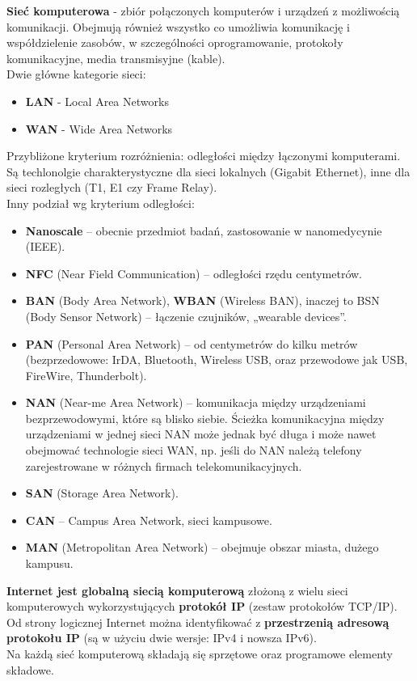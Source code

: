 \documentclass[../main.tex]{subfiles}
\begin{document}
    \textbf{Sieć komputerowa} - zbiór połączonych komputerów i urządzeń z możliwością komunikacji. Obejmują	również	wszystko co	umożliwia
    komunikację i współdzielenie zasobów, w szczególności oprogramowanie, protokoły komunikacyjne, media transmisyjne (kable).
    \\
    Dwie główne kategorie sieci:
    \begin{itemize}
        \item \textbf{LAN} - Local Area Networks
        \item \textbf{WAN} - Wide Area Networks
    \end{itemize}

    Przybliżone  kryterium	 rozróżnienia: odległości między łączonymi	komputerami. Są techlonolgie charakterystyczne dla
    sieci	lokalnych (Gigabit Ethernet),	inne dla sieci rozległych (T1,	E1	czy	Frame	Relay).
    \\
    Inny podział wg kryterium odległości:
    \begin{itemize}
        \item \textbf{Nanoscale} – obecnie przedmiot badań, zastosowanie w nanomedycynie (IEEE).
        \item \textbf{NFC} (Near Field Communication) – odległości	rzędu	centymetrów.
        \item \textbf{BAN} (Body Area Network),	\textbf{WBAN} (Wireless	BAN),	inaczej to	BSN	(Body	Sensor	Network) – łączenie	czujników,	„wearable	devices”.
        \item \textbf{PAN} (Personal Area Network) – od centymetrów	do	kilku metrów (bezprzedowowe: IrDA,	Bluetooth,	Wireless USB,	oraz	przewodowe	jak	USB,	FireWire,
        Thunderbolt).
        \item \textbf{NAN} (Near-me	Area	Network)	– komunikacja	między	urządzeniami bezprzewodowymi, które	są	blisko	siebie. Ścieżka	komunikacyjna	między	urządzeniami	w	jednej	sieci	NAN	może jednak	być	długa	i	może	nawet	obejmować	technologie	sieci	WAN,	np.	jeśli	do	NAN	należą telefony	zarejestrowane	w	różnych	firmach	telekomunikacyjnych.
        \item \textbf{SAN} (Storage	Area	Network).
        \item \textbf{CAN} – Campus	Area	Network,	sieci	kampusowe.
        \item \textbf{MAN} (Metropolitan	Area	Network)	– obejmuje	obszar	miasta,	dużego	kampusu.
    \end{itemize}

    \textbf{Internet jest globalną	 siecią	 komputerową} złożoną z	 wielu	 sieci	 komputerowych wykorzystujących	 \textbf{protokół IP} (zestaw protokołów TCP/IP). Od strony	 logicznej	 Internet można	identyfikować	z	\textbf{przestrzenią	adresową	protokołu	IP}	 (są	w użyciu	dwie wersje:	IPv4 i nowsza IPv6).\\
    Na	każdą	sieć	komputerową	składają	się	sprzętowe	oraz	programowe	elementy	składowe.
\end{document}
